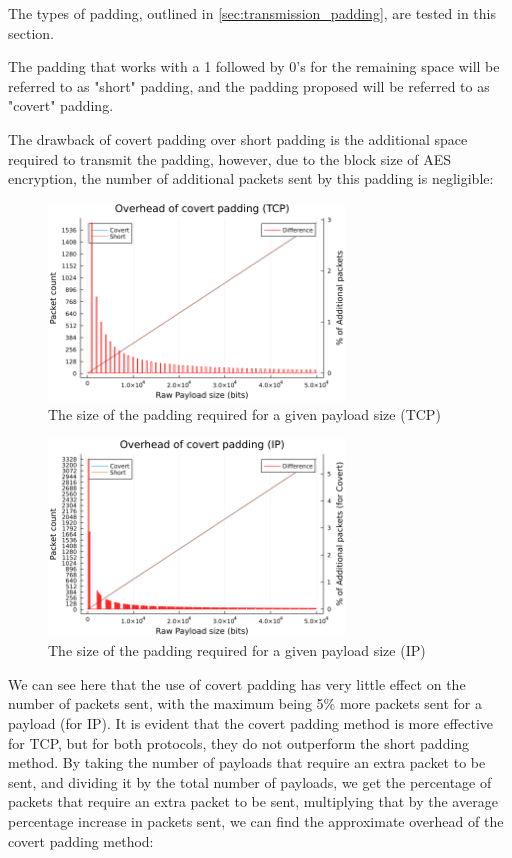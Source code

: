 The types of padding, outlined in \ref{sec:transmission_padding}, are tested in this section.

The padding that works with a 1 followed by 0's for the remaining space will be referred to as "short" padding, and the padding proposed will be referred to as "covert" padding.

The drawback of covert padding over short padding is the additional space required to transmit the padding, however, due to the block size of AES encryption, the number of additional packets sent by this padding is negligible:

\begin{figure}[h]
    \centering
    \includegraphics[width=0.7\textwidth]{fig/padding_size_TCP.png}
    \caption{The size of the padding required for a given payload size (TCP)}
    \label{fig:padding_size_TCP}
\end{figure}

\begin{figure}[h]
    \centering
    \includegraphics[width=0.7\textwidth]{fig/padding_size_IP.png}
    \caption{The size of the padding required for a given payload size (IP)}
    \label{fig:padding_size_IP}
\end{figure}

We can see here that the use of covert padding has very little effect on the number of packets sent, with the maximum being 5\% more packets sent for a payload (for IP). It is evident that the covert padding method is more effective for TCP, but for both protocols, they do not outperform the short padding method. By taking the number of payloads that require an extra packet to be sent, and dividing it by the total number of payloads, we get the percentage of packets that require an extra packet to be sent, multiplying that by the average percentage increase in packets sent, we can find the approximate overhead of the covert padding method:

